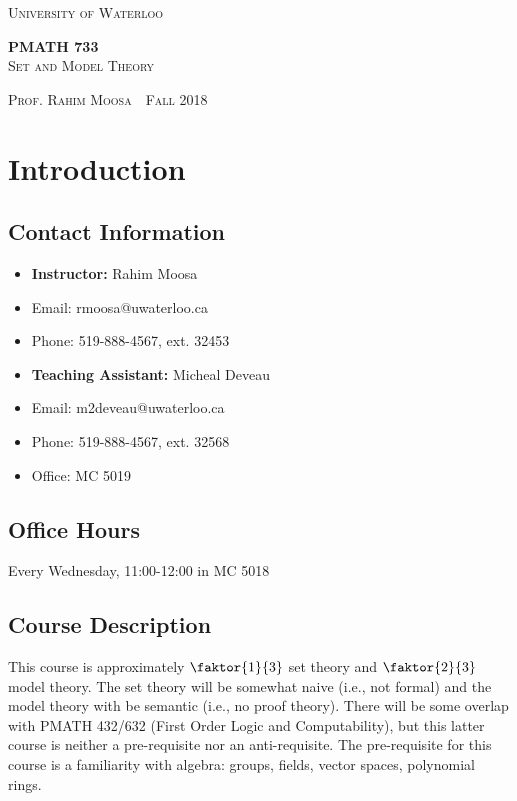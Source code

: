 \documentclass[11pt]{article}
\theoremstyle{theorem}
\newcommand{\thiscoursecode}{PMATH 733}
\newcommand{\thiscoursename}{Set and Model Theory}
\newcommand{\thisprof}{Rahim Moosa}
\newcommand{\thisterm}{Fall 2018}
\begin{document}
\begin{titlepage}
    \begin{centering}
        {\scshape\LARGE University of Waterloo \par}
        \globe
        {\huge\bf \thiscoursecode}\\
        {\scshape\Large \thiscoursename}\\
        \vspace{.3cm}
        {\scshape Prof. \thisprof~\textbullet~\thisterm\par}
    \end{centering}
\sectionline
\tableofcontents
\sectionline
\thispagestyle{empty}

\pagebreak
\section{Introduction}
\subsection{Contact Information}
\begin{itemize}
    \item {\bf Instructor:} Rahim Moosa
    \item Email: rmoosa@uwaterloo.ca
    \item Phone: 519-888-4567, ext. 32453
\\
    \item {\bf Teaching Assistant:} Micheal Deveau
    \item Email: m2deveau@uwaterloo.ca
    \item Phone: 519-888-4567, ext. 32568
    \item Office: MC 5019
\end{itemize}

\subsection{Office Hours}
Every Wednesday, 11:00-12:00 in MC 5018

\subsection{Course Description}
This course is approximately $\faktor{1}{3}$ set theory and $\faktor{2}{3}$
model theory. The set theory will be somewhat naive (i.e., not formal) and the
model theory with be semantic (i.e., no proof theory). There will be some
overlap with PMATH 432/632 (First Order Logic and Computability), but this
latter course is neither a pre-requisite nor an anti-requisite. The
pre-requisite for this course is a familiarity with algebra: groups, fields,
vector spaces, polynomial rings.


\end{titlepage}
\end{document}
